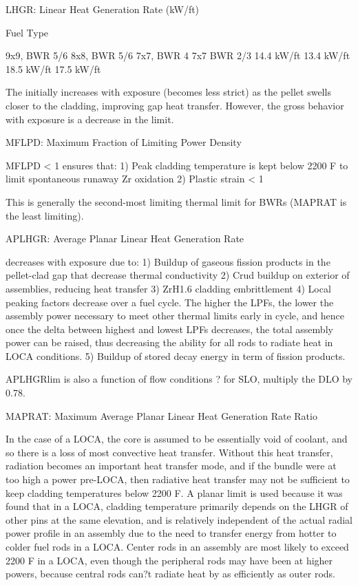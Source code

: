 \documentclass[10pt]{article}
\begin{document}
LHGR: Linear Heat Generation Rate (kW/ft)



Fuel Type

9x9, BWR 5/6
8x8, BWR 5/6
7x7, BWR 4
7x7 BWR 2/3
14.4 kW/ft
13.4 kW/ft
18.5 kW/ft
17.5 kW/ft

The  initially increases with exposure (becomes less strict) as the pellet swells closer to the cladding, improving gap heat transfer. However, the gross behavior with exposure is a decrease in the limit. 

MFLPD: Maximum Fraction of Limiting Power Density



MFLPD < 1 ensures that:
1)	Peak cladding temperature is kept below 2200 F to limit spontaneous runaway Zr oxidation
2)	Plastic strain < 1%

This is generally the second-most limiting thermal limit for BWRs (MAPRAT is the least limiting). 

APLHGR: Average Planar Linear Heat Generation Rate



decreases with exposure due to: 
1)	Buildup of gaseous fission products in the pellet-clad gap that decrease thermal conductivity
2)	Crud buildup on exterior of assemblies, reducing heat transfer
3)	ZrH1.6 cladding embrittlement
4)	Local peaking factors decrease over a fuel cycle. The higher the LPFs, the lower the assembly power necessary to meet other thermal limits early in cycle, and hence once the delta between highest and lowest LPFs decreases, the total assembly power can be raised, thus decreasing the ability for all rods to radiate heat in LOCA conditions. 
5)	Buildup of stored decay energy in term of fission products.

APLHGRlim is also a function of flow conditions ? for SLO, multiply the DLO by 0.78. 

MAPRAT: Maximum Average Planar Linear Heat Generation Rate Ratio



In the case of a LOCA, the core is assumed to be essentially void of coolant, and so there is a loss of most convective heat transfer. Without this heat transfer, radiation becomes an important heat transfer mode, and if the bundle were at too high a power pre-LOCA, then radiative heat transfer may not be sufficient to keep cladding temperatures below 2200 F. A planar limit is used because it was found that in a LOCA, cladding temperature primarily depends on the LHGR of other pins at the same elevation, and is relatively independent of the actual radial power profile in an assembly due to the need to transfer energy from hotter to colder fuel rods in a LOCA. Center rods in an assembly are most likely to exceed 2200 F in a LOCA, even though the peripheral rods may have been at higher powers, because central rods can?t radiate heat by as efficiently as outer rods. 
\end{document}
